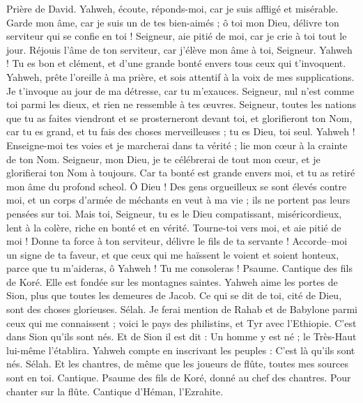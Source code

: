 \begin{multicols}{2}
\VerseOne{}Prière de David. Yahweh, écoute, réponds-moi, car je suis affligé et misérable.
Garde mon âme, car je suis un de tes bien-aimés ; ô toi mon Dieu, délivre ton serviteur qui se confie en toi !
Seigneur, aie pitié de moi, car je crie à toi tout le jour.
Réjouis l'âme de ton serviteur, car j'élève mon âme à toi, Seigneur.
Yahweh ! Tu es bon et clément, et d'une grande bonté envers tous ceux qui t'invoquent.
Yahweh, prête l'oreille à ma prière, et sois attentif à la voix de mes supplications.
Je t'invoque au jour de ma détresse, car tu m'exauces.
Seigneur, nul n'est comme toi parmi les dieux, et rien ne ressemble à tes œuvres.
Seigneur, toutes les nations que tu as faites viendront et se prosterneront devant toi, et glorifieront ton Nom,
car tu es grand, et tu fais des choses merveilleuses ; tu es Dieu, toi seul.
Yahweh ! Enseigne-moi tes voies et je marcherai dans ta vérité ; lie mon cœur à la crainte de ton Nom.
Seigneur, mon Dieu, je te célébrerai de tout mon cœur, et je glorifierai ton Nom à toujours.
Car ta bonté est grande envers moi, et tu as retiré mon âme du profond scheol.
Ô Dieu ! Des gens orgueilleux se sont élevés contre moi, et un corps d'armée de méchants en veut à ma vie ; ils ne portent pas leurs pensées sur toi.
Mais toi, Seigneur, tu es le Dieu compatissant, miséricordieux, lent à la colère, riche en bonté et en vérité.
Tourne-toi vers moi, et aie pitié de moi ! Donne ta force à ton serviteur, délivre le fils de ta servante !
Accorde–moi un signe de ta faveur, et que ceux qui me haïssent le voient et soient honteux, parce que tu m'aideras, ô Yahweh ! Tu me consoleras !
\VerseOne{}Psaume. Cantique des fils de Koré. Elle est fondée sur les montagnes saintes.
Yahweh aime les portes de Sion, plus que toutes les demeures de Jacob.
Ce qui se dit de toi, cité de Dieu, sont des choses glorieuses. Sélah.
Je ferai mention de Rahab et de Babylone parmi ceux qui me connaissent ; voici le pays des philistins, et Tyr avec l'Ethiopie. C'est dans Sion qu'ils sont nés.
Et de Sion il est dit : Un homme y est né ; le Très-Haut lui-même l'établira.
Yahweh compte en inscrivant les peuples : C'est là qu'ils sont nés. Sélah.
Et les chantres, de même que les joueurs de flûte, toutes mes sources sont en toi.
\VerseOne{}Cantique. Psaume des fils de Koré, donné au chef des chantres. Pour chanter sur la flûte. Cantique d'Héman, l'Ezrahite.

\end{multicols}
